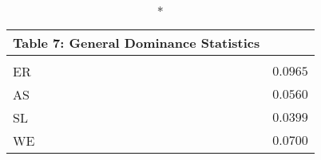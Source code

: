 \begin{longtable}{l|r}
\caption*{
{\large Table 7: General Dominance Statistics}
} \\ 
\toprule
\multicolumn{1}{l}{} &  \\ 
\midrule
ER & $0.0965$ \\ 
AS & $0.0560$ \\ 
SL & $0.0399$ \\ 
WE & $0.0700$ \\ 
\bottomrule
\end{longtable}

